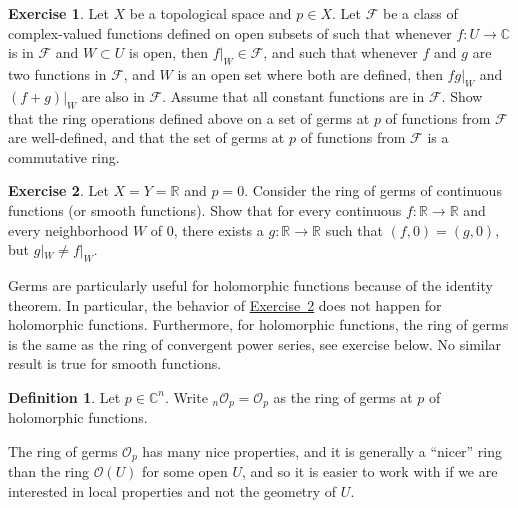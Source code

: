 \documentclass[12pt,openany]{book}
\newcommand{\C}{{\mathbb{C}}}
\newcommand{\R}{{\mathbb{R}}}
\newcommand{\sF}{{\mathscr{F}}}
\newcommand{\sO}{{\mathscr{O}}}
\theoremstyle{plain}
\theoremstyle{remark}
\theoremstyle{definition}
\newtheorem{defn}[thm]{Definition}
\newenvironment{exbox}{%
    \def\FrameCommand{\vrule width 1pt \relax\hspace{10pt}}%
    \MakeFramed{\advance\hsize-\width\FrameRestore}%
}{%
    \endMakeFramed
}
\theoremstyle{exercise}
\newtheorem{exercise}{Exercise}[section]
\theoremstyle{example}
\newcommand{\exerciseref}[1]{\hyperref[#1]{Exercise~\ref*{#1}}}
\begin{document}
\begin{exbox}
\begin{exercise}
Let $X$ be a topological space and $p \in X$.
Let $\sF$ be a class of complex-valued functions defined on open subsets
of such that whenever $f \colon U \to \C$ is in $\sF$ and $W \subset U$ is open,
then $f|_W \in \sF$, and such that whenever $f$ and $g$
are two functions in $\sF$, and $W$ is an open set where both are defined,
then $fg|_W$ and $(f+g)|_W$ are also in $\sF$.
Assume that all constant functions are in $\sF$.
Show that the ring operations defined above
on a set of germs at $p$ of functions from $\sF$ are well-defined,
and that the set of germs at $p$ of functions from $\sF$ is a commutative
ring.
\end{exercise}

\begin{exercise} \label{exercise:contgermsnothausdorf}
Let $X=Y=\R$ and $p=0$.  Consider the ring of germs of
continuous functions (or smooth functions).
Show that for every continuous $f \colon \R \to \R$ and every neighborhood
$W$ of $0$, there exists a $g \colon \R \to \R$
such that $(f,0) = (g,0)$, but $g|_W \not= f|_W$.
\end{exercise}
\end{exbox}

Germs are particularly useful for holomorphic functions because of the identity
theorem.  In particular, the behavior of
\exerciseref{exercise:contgermsnothausdorf} does not happen
for holomorphic functions.  Furthermore, for holomorphic functions, the
ring of germs is the same as the ring of convergent power series, see
exercise below.  No similar result is true for smooth functions.

\begin{defn}
Let $p \in \C^n$.
%
Write
${}_n\sO_p = \sO_p$ as the ring of germs at $p$ of holomorphic functions.
\end{defn}

The ring of germs $\sO_p$ has many nice properties,
and it is generally a ``nicer'' ring than the ring $\sO(U)$ for
some open $U$, and so it is easier to work with if we are interested
in local properties and not the geometry of $U$.
\end{document}
